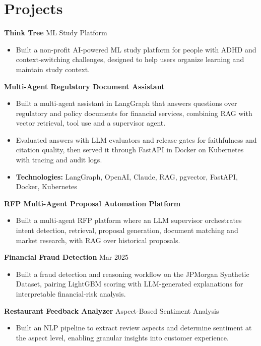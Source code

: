 \documentclass[10pt,a4paper]{article}
\begin{document}
\section{Projects}
\textbf{Think Tree} \textbar{} ML Study Platform\par
\begin{itemize}
  \item Built a non-profit AI-powered ML study platform for people with ADHD and context-switching challenges, designed to help users organize learning and maintain study context.
\end{itemize}
\textbf{Multi-Agent Regulatory Document Assistant}\par
\begin{itemize}
  \item Built a multi-agent assistant in LangGraph that answers questions over regulatory and policy documents for financial services, combining RAG with vector retrieval, tool use and a supervisor agent.
  \item Evaluated answers with LLM evaluators and release gates for faithfulness and citation quality, then served it through FastAPI in Docker on Kubernetes with tracing and audit logs.
  \item \textbf{Technologies:} LangGraph, OpenAI, Claude, RAG, pgvector, FastAPI, Docker, Kubernetes
\end{itemize}
\textbf{RFP Multi-Agent Proposal Automation Platform}\par
\begin{itemize}
  \item Built a multi-agent RFP platform where an LLM supervisor orchestrates intent detection, retrieval, proposal generation, document matching and market research, with RAG over historical proposals.
\end{itemize}
\textbf{Financial Fraud Detection} \textbar{} Mar 2025\par
\begin{itemize}
  \item Built a fraud detection and reasoning workflow on the JPMorgan Synthetic Dataset, pairing LightGBM scoring with LLM-generated explanations for interpretable financial-risk analysis.
\end{itemize}
\textbf{Restaurant Feedback Analyzer} \textbar{} Aspect-Based Sentiment Analysis\par
\begin{itemize}
  \item Built an NLP pipeline to extract review aspects and determine sentiment at the aspect level, enabling granular insights into customer experience.
\end{itemize}
\end{document}
